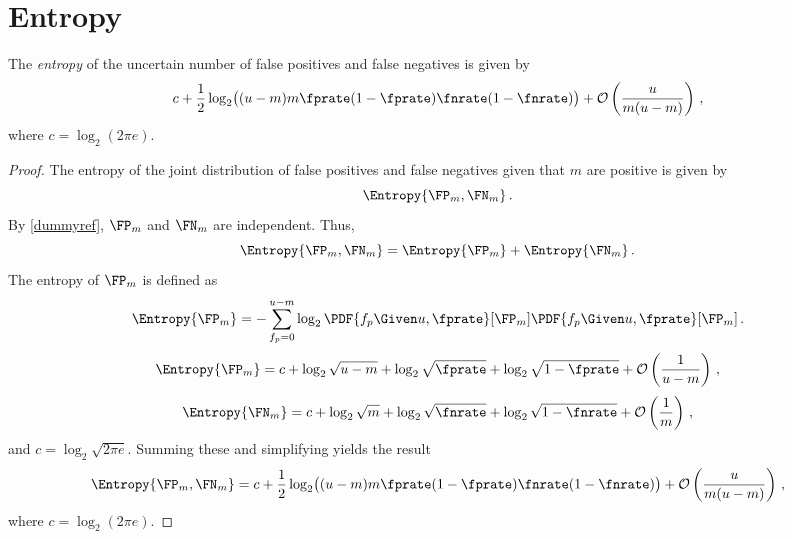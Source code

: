 \documentclass[ ../main.tex]{subfiles}
\begin{document}
\section{Entropy}
\label{sec:entropy}
\begin{theorem}
The \emph{entropy} of the uncertain number of false positives and false negatives is given by
\begin{equation}
    c + \frac{1}{2} \log_2\!\left((u - m)m\fprate(1 - \fprate)\fnrate(1-\fnrate)\right) + \mathcal{O}\left(\frac{u}{m(u - m)}\right)\,,
\end{equation}
where $c = \log_2(2 \pi e)$.
\end{theorem}
\begin{proof}
The entropy of the joint distribution of false positives and false negatives given that $m$ are positive is given by
\begin{equation}
    \Entropy{\FP_m, \FN_m}\,.
\end{equation}
By \cref{dummyref}, $\FP_m$ and $\FN_m$ are independent. Thus,
\begin{equation}
    \Entropy{\FP_m,\FN_m} = \Entropy{\FP_m} + \Entropy{\FN_m}\,.
\end{equation}
The entropy of $\FP_m$ is defined as
\begin{equation}
    \Entropy{\FP_m} = -\sum_{f_p = 0}^{u - m} \log_2 \PDF{f_p \Given u, \fprate}[\FP_m] \PDF{f_p \Given u, \fprate}[\FP_m]\,.
\end{equation}
\begin{equation}
    \Entropy{\FP_m} = c + \log_2 \sqrt{u - m} + \log_2 \sqrt{\fprate} + \log_2 \sqrt{1 - \fprate} + \mathcal{O}\left(\frac{1}{u - m}\right)\,,
\end{equation}
\begin{equation}
    \Entropy{\FN_m} = c + \log_2 \sqrt{m} + \log_2 \sqrt{\fnrate} + \log_2 \sqrt{1 - \fnrate} + \mathcal{O}\left(\frac{1}{m}\right)\,,
\end{equation}
and $c = \log_2 \sqrt{2 \pi e}$. Summing these and simplifying yields the result
\begin{equation}
    \Entropy{\FP_m, \FN_m} = c + \frac{1}{2} \log_2\!\left((u - m)m\fprate(1 - \fprate)\fnrate(1-\fnrate)\right) + \mathcal{O}\left(\frac{u}{m(u - m)}\right)\,,
\end{equation}
where $c = \log_2(2 \pi e)$.
\end{proof}
\end{document}
